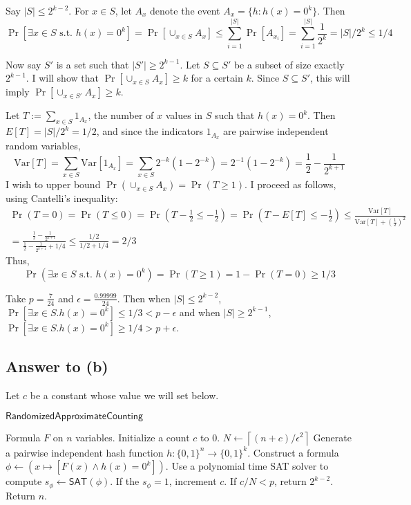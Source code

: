 \documentclass{article}
\begin{document}
Say $|S| \leq 2^{k - 2}$.
For $x \in S$, let $A_x$ denote the event $A_x = \{h : h(x) = 0^k\}$.
Then 
$$
	\Pr[\exists x \in S \text{ s.t. } h(x) = 0^k]
	= \Pr[\cup_{x \in S} A_x]
	\leq
	\sum_{i=1}^{|S|} \Pr[A_{x_i}]
	= \sum_{i=1}^{|S|} \frac{1}{2^k}
	= |S|/2^k
	\leq 1/4
$$

\medskip
\noindent
Now say $S'$ is a set such that $|S'| \geq 2^{k-1}$.
Let $S \subseteq S'$ be a subset of size exactly $2^{k-1}$.
I will show that $\Pr[\cup_{x \in S}A_x] \geq k$ for a certain $k$.
Since $S \subseteq S'$, this will imply $\Pr[\cup_{x \in S'}A_x] \geq k$.

Let $T := \sum_{x \in S}1_{A_x}$, the number of $x$ values in $S$ such that $h(x) = 0^k$.
Then $E[T] = |S|/2^k = 1/2$, and
since the indicators $1_{A_x}$ are pairwise independent random variables,
$$
\text{Var}[T] = \sum_{x \in S} \text{Var}[1_{A_x}]
= \sum_{x \in S} 2^{-k}(1 - 2^{-k})
= 2^{-1}(1 - 2^{-k}) = \frac{1}{2} - \frac{1}{2^{k+1}}
$$
I wish to upper bound $\Pr(\cup_{x \in S} A_x) = \Pr(T \geq 1)$.
I proceed as follows, using Cantelli's inequality:
\begin{multline*}
\Pr(T = 0) =
\Pr(T \leq 0) = \Pr(T - \frac{1}{2} \leq -\frac{1}{2}) = \Pr(T - E[T] \leq -\frac{1}{2})
\leq \frac{\text{Var}[T]}{\text{Var}[T] + (\frac{1}{2})^2} \\
= \frac{\frac{1}{2} - \frac{1}{2^{k+1}}}{
	\frac{1}{2} - \frac{1}{2^{k+1}} + 1/4
} \leq \frac{1/2}{1/2 + 1/4} = 2/3
\end{multline*}
Thus,
$$
\Pr(\exists x \in S \text{ s.t. } h(x) = 0^k) = \Pr(T \geq 1) = 1 - \Pr(T = 0) \geq 1/3
$$

\medskip
\noindent
Take $p = \frac{7}{24}$ and $\epsilon = \frac{0.99999}{24}$.
Then when $|S| \leq 2^{k-2}$, $\Pr[\exists x \in S . h(x) =0^k] \leq 1/3 < p - \epsilon$
and when $|S| \geq 2^{k-1}$, $\Pr[\exists x \in S . h(x) =0^k] \geq 1/4 > p + \epsilon$.

\subsection*{Answer to (b)}

Let $c$ be a constant whose value we will set below.

\begin{algorithm}{$\mathsf{RandomizedApproximateCounting}$}
\begin{algorithmic}[1]
\Require Formula $F$ on $n$ variables.
	\State Initialize a count $c$ to $0$.
	\State $N \gets \left \lceil{(n + c)/\epsilon^2}\right \rceil$
		\State Generate a pairwise independent hash function $h : \{0, 1\}^n \to \{0, 1\}^k$.
		\State Construct a formula $\phi \gets (x \mapsto [F(x) \wedge h(x) = 0^k])$.
		\State Use a polynomial time SAT solver to compute $s_\phi \gets \mathsf{SAT}(\phi)$.
		\State If the $s_\phi = 1$, increment $c$.
	\EndFor
	\State If $c / N < p$, return $2^{k-2}$.
\EndFor
\State Return $n$.
\end{algorithmic}
\end{algorithm}
\end{document}
